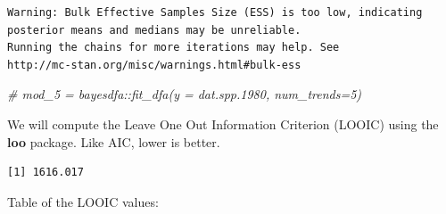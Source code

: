 \documentclass[
]{article}
\newenvironment{Shaded}{\begin{snugshade}}{\end{snugshade}}
\newcommand{\CommentTok}[1]{\textcolor[rgb]{0.56,0.35,0.01}{\textit{#1}}}
\newcommand{\DataTypeTok}[1]{\textcolor[rgb]{0.13,0.29,0.53}{#1}}
\newcommand{\DecValTok}[1]{\textcolor[rgb]{0.00,0.00,0.81}{#1}}
\newcommand{\KeywordTok}[1]{\textcolor[rgb]{0.13,0.29,0.53}{\textbf{#1}}}
\newcommand{\NormalTok}[1]{#1}
\newcommand{\OperatorTok}[1]{\textcolor[rgb]{0.81,0.36,0.00}{\textbf{#1}}}
\newcommand{\StringTok}[1]{\textcolor[rgb]{0.31,0.60,0.02}{#1}}
\begin{document}
\begin{verbatim}
Warning: Bulk Effective Samples Size (ESS) is too low, indicating posterior means and medians may be unreliable.
Running the chains for more iterations may help. See
http://mc-stan.org/misc/warnings.html#bulk-ess
\end{verbatim}

\begin{Shaded}
\begin{Highlighting}[]
\CommentTok{# mod_5 = bayesdfa::fit_dfa(y = dat.spp.1980, num_trends=5)}
\end{Highlighting}
\end{Shaded}

We will compute the Leave One Out Information Criterion (LOOIC) using
the \textbf{loo} package. Like AIC, lower is better.

\begin{Shaded}
\end{Shaded}

\begin{verbatim}
[1] 1616.017
\end{verbatim}

Table of the LOOIC values:

\begin{Shaded}
\end{Shaded}
\end{document}
